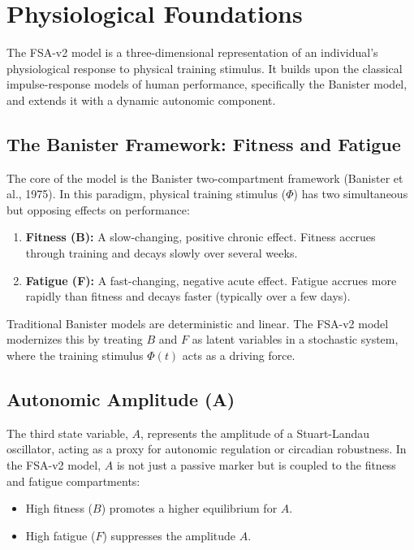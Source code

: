 \section{Physiological Foundations}

The FSA-v2 model is a three-dimensional representation of an individual's physiological response to physical training stimulus. It builds upon the classical impulse-response models of human performance, specifically the Banister model, and extends it with a dynamic autonomic component.

\subsection{The Banister Framework: Fitness and Fatigue}

The core of the model is the Banister two-compartment framework (Banister et al., 1975). In this paradigm, physical training stimulus ($\Phi$) has two simultaneous but opposing effects on performance:
\begin{enumerate}
    \item \textbf{Fitness (B):} A slow-changing, positive chronic effect. Fitness accrues through training and decays slowly over several weeks.
    \item \textbf{Fatigue (F):} A fast-changing, negative acute effect. Fatigue accrues more rapidly than fitness and decays faster (typically over a few days).
\end{enumerate}

Traditional Banister models are deterministic and linear. The FSA-v2 model modernizes this by treating \(B\) and \(F\) as latent variables in a stochastic system, where the training stimulus \(\Phi(t)\) acts as a driving force.

\subsection{Autonomic Amplitude (A)}

The third state variable, \(A\), represents the amplitude of a Stuart-Landau oscillator, acting as a proxy for autonomic regulation or circadian robustness. In the FSA-v2 model, \(A\) is not just a passive marker but is coupled to the fitness and fatigue compartments:
\begin{itemize}
    \item High fitness (\(B\)) promotes a higher equilibrium for \(A\).
    \item High fatigue (\(F\)) suppresses the amplitude \(A\).
\end{itemize}

